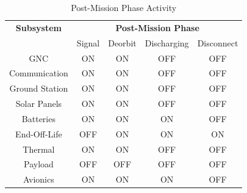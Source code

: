 \begin{table}[htbp]
  \centering
  \caption{Post-Mission Phase Activity}
    \begin{tabular}{|c|c|c|c|c|}
    \hline
    \textbf{Subsystem} & \multicolumn{4}{c|}{\textbf{Post-Mission Phase}} \\
          & \multicolumn{1}{c}{Signal} & \multicolumn{1}{c}{Deorbit} & \multicolumn{1}{c}{Discharging} & Disconnect \\
    GNC   & \cellcolor[rgb]{ .573,  .816,  .314}ON & \cellcolor[rgb]{ .573,  .816,  .314}ON & \cellcolor[rgb]{ .753,  0,  0}OFF & \cellcolor[rgb]{ .753,  0,  0}OFF \\
Communication & \cellcolor[rgb]{ .573,  .816,  .314}ON & \cellcolor[rgb]{ .573,  .816,  .314}ON & \cellcolor[rgb]{ .753,  0,  0}OFF & \cellcolor[rgb]{ .753,  0,  0}OFF \\
  Ground Station & \cellcolor[rgb]{ .573,  .816,  .314}ON & \cellcolor[rgb]{ .573,  .816,  .314}ON & \cellcolor[rgb]{ .753,  0,  0}OFF & \cellcolor[rgb]{ .753,  0,  0}OFF \\
    Solar Panels  & \cellcolor[rgb]{ .573,  .816,  .314}ON & \cellcolor[rgb]{ .573,  .816,  .314}ON & \cellcolor[rgb]{ .753,  0,  0}OFF & \cellcolor[rgb]{ .753,  0,  0}OFF \\
    Batteries  & \cellcolor[rgb]{ .573,  .816,  .314}ON & \cellcolor[rgb]{ .573,  .816,  .314}ON & \cellcolor[rgb]{ .573,  .816,  .314}ON & \cellcolor[rgb]{ .753,  0,  0}OFF \\
End-Off-Life & \cellcolor[rgb]{ .753,  0,  0}OFF & \cellcolor[rgb]{ .573,  .816,  .314}ON & \cellcolor[rgb]{ .573,  .816,  .314}ON & \cellcolor[rgb]{ .573,  .816,  .314}ON \\
Thermal  & \cellcolor[rgb]{ .573,  .816,  .314}ON & \cellcolor[rgb]{ .573,  .816,  .314}ON & \cellcolor[rgb]{ .753,  0,  0}OFF & \cellcolor[rgb]{ .753,  0,  0}OFF \\
  Payload & \cellcolor[rgb]{ .753,  0,  0}OFF & \cellcolor[rgb]{ .753,  0,  0}OFF & \cellcolor[rgb]{ .753,  0,  0}OFF & \cellcolor[rgb]{ .753,  0,  0}OFF \\
  Avionics & \cellcolor[rgb]{ .573,  .816,  .314}ON & \cellcolor[rgb]{ .573,  .816,  .314}ON & \cellcolor[rgb]{ .573,  .816,  .314}ON & \cellcolor[rgb]{ .753,  0,  0}OFF \\
    \hline
    \end{tabular}%
  \label{tab:on3}%
\end{table}%
